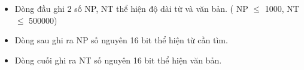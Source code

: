 \begin{itemize}
	\item Dòng đầu ghi 2 số NP, NT thể hiện độ dài từ và văn bản. ( NP  $\le$  1000, NT  $\le$  500000)
\end{itemize}
\begin{itemize}
	\item Dòng sau ghi ra NP số nguyên 16 bit thể hiện từ cần tìm.
\end{itemize}
\begin{itemize}
	\item Dòng cuối ghi ra NT số nguyên 16 bit thể hiện văn bản.
\end{itemize}